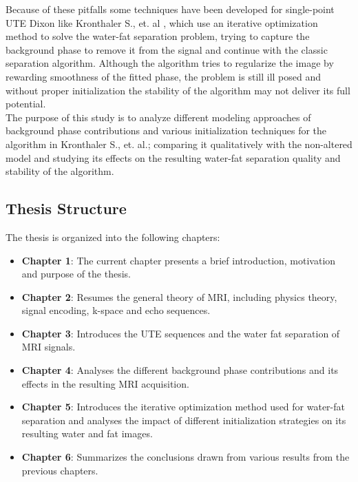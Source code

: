 Because of these pitfalls some techniques have been developed for single-point UTE Dixon like Kronthaler S., et. al \cite{kronthaler}, which use an iterative optimization method to solve the water-fat separation problem, trying to capture the background phase to remove it from the signal and continue with the classic separation algorithm. Although the algorithm tries to regularize the image by rewarding smoothness of the fitted phase, the problem is still ill posed and without proper initialization the stability of the algorithm may not deliver its full potential.\\

The purpose of this study is to analyze different modeling approaches of background phase contributions and various initialization techniques for the algorithm in Kronthaler S., et. al.; comparing it qualitatively with the non-altered model and studying its effects on the resulting water-fat separation quality and stability of the algorithm.\\

\subsection{Thesis Structure}
The thesis is organized into the following chapters:
\begin{itemize}
\item \textbf{Chapter 1}: The current chapter presents a brief introduction, motivation and purpose of the thesis.
\item \textbf{Chapter 2}: Resumes the general theory of MRI, including physics theory, signal encoding, k-space and echo sequences.
\item \textbf{Chapter 3}: Introduces the UTE sequences and the water fat separation of MRI signals.
\item \textbf{Chapter 4}: Analyses the different background phase contributions and its effects in the resulting MRI acquisition.
\item \textbf{Chapter 5}: Introduces the iterative optimization method used for water-fat separation and analyses the impact of different initialization strategies on its resulting water and fat images.
\item \textbf{Chapter 6}: Summarizes the conclusions drawn from various results from the previous
chapters.
\end{itemize}

